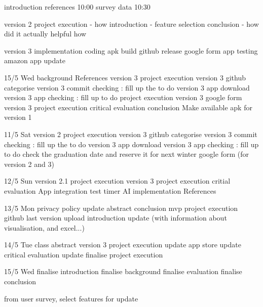 introduction
    references 10:00
    survey data 10:30

version 2 project execution - how
    introduction - feature selection
    conclusion - how did it actually helpful
    how

version 3 implementation
    coding 
    apk build
    github release
    google form
    app testing
    amazon app update



15/5 Wed
background 
References
version 3 project execution
version 3 github categorise 
version 3 commit checking : fill up the to do
version 3 app download 
version 3 app checking : fill up to do
project execution version 3
google form version 3
project execution
critical evaluation
conclusion
Make available apk for version 1


11/5 Sat
version 2 project execution
version 3 github categorise 
version 3 commit checking : fill up the to do
version 3 app download 
version 3 app checking : fill up to do
check the graduation date and reserve it for next winter
google form (for version 2 and 3)


12/5 Sun
version 2.1 project execution
version 3 project execution
critial evaluation
App integration test
timer
AI implementation
References


13/5 Mon
privacy policy update
abstract
conclusion
mvp project execution
github last version upload
introduction update (with information about visualisation, and excel...)


14/5 Tue
class abstract
version 3 project execution update
app store update
critical evaluation update
finalise project execution

15/5 Wed
finalise introduction
finalise background
finalise evaluation
finalise conclusion



from user survey, select features for update
